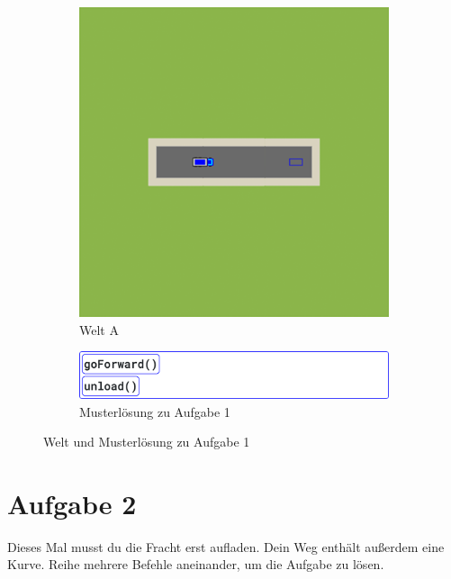 \begin{figure}[H]
  \begin{subfigure}[b]{0.40\textwidth}
    \includegraphics[width=\textwidth]{gfx/exercises-world-a.png}
    \caption{Welt A}
  \end{subfigure}\hfill
  \begin{subfigure}[b]{0.40\textwidth}
    \includegraphics[width=\textwidth]{gfx/exercises-program-1.png}
    \caption{Musterlösung zu Aufgabe 1}
  \end{subfigure}\hfill
  \caption{Welt und Musterlösung zu Aufgabe 1}
\end{figure}

\pagebreak

\section*{Aufgabe 2}
\label{sec:exercises:2}

Dieses Mal musst du die Fracht erst aufladen. Dein Weg enthält außerdem eine Kurve. Reihe mehrere Befehle aneinander, um die Aufgabe zu lösen.

